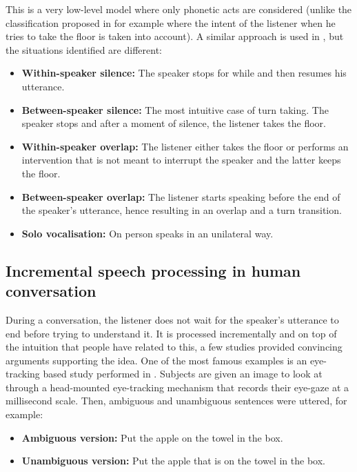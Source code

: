 				This is a very low-level model where only phonetic acts are considered (unlike the classification proposed in \cite{Beattie1982} for example where the intent of the listener when he tries to take the floor is taken into account). A similar approach is used in \cite{Wlodarczak2013}, but the situations identified are different:

        \begin{itemize}
           \item \textbf{Within-speaker silence:} The speaker stops for while and then resumes his utterance.
           \item \textbf{Between-speaker silence:} The most intuitive case of turn taking. The speaker stops and after a moment of silence, the listener takes the floor.
           \item \textbf{Within-speaker overlap:} The listener either takes the floor or performs an intervention that is not meant to interrupt the speaker and the latter keeps the floor.
           \item \textbf{Between-speaker overlap:} The listener starts speaking before the end of the speaker's utterance, hence resulting in an overlap and a turn transition.
           \item \textbf{Solo vocalisation:} On person speaks in an unilateral way.
        \end{itemize}
				
	\subsection{Incremental speech processing in human conversation}
	\label{soa:inchuman}

           During a conversation, the listener does not wait for the speaker's utterance to end before trying to understand it. It is processed incrementally and on top of the intuition that people have related to this, a few studies provided convincing arguments supporting the idea. One of the most famous examples is an eye-tracking based study performed in \cite{Tanenhaus1995}. Subjects are given an image to look at through a head-mounted eye-tracking mechanism that records their eye-gaze at a millisecond scale. Then, ambiguous and unambiguous sentences were uttered, for example:

           \begin{itemize}
             \item \textbf{Ambiguous version:} Put the apple on the towel in the box.
             \item \textbf{Unambiguous version:} Put the apple that is on the towel in the box.
           \end{itemize}

